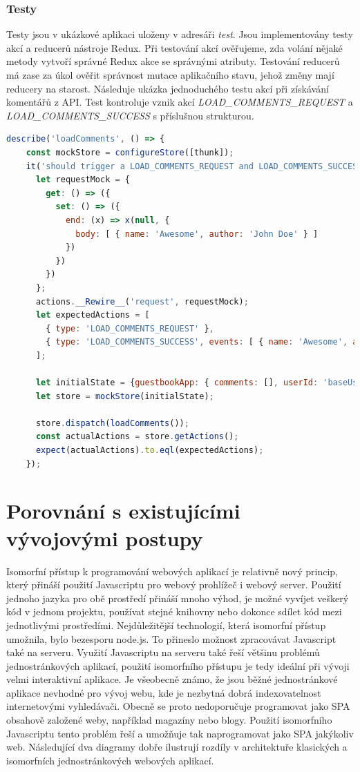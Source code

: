 \subsection{Testy}
Testy jsou v ukázkové aplikaci uloženy v adresáři \textit{test}. Jsou implementovány testy akcí a reducerů nástroje Redux. Při testování akcí ověřujeme, zda volání nějaké metody vytvoří správné Redux akce se správnými atributy. Testování reducerů má zase za úkol ověřit správnost mutace aplikačního stavu, jehož změny mají reducery na starost. Následuje ukázka jednoduchého testu akcí při získávání komentářů z API. Test kontroluje vznik akcí \textit{LOAD\_COMMENTS\_REQUEST} a \textit{LOAD\_COMMENTS\_SUCCESS} s příslušnou strukturou.
\begin{lstlisting}[language=Javascript, caption={Ukázka asynchronního testu získávání datových entit – komentářů}]
  describe('loadComments', () => {
    const mockStore = configureStore([thunk]);
    it('should trigger a LOAD_COMMENTS_REQUEST and LOAD_COMMENTS_SUCCESS action when succesful', () => {
      let requestMock = {
        get: () => ({
          set: () => ({
            end: (x) => x(null, {
              body: [ { name: 'Awesome', author: 'John Doe' } ]
            })
          })
        })
      };
      actions.__Rewire__('request', requestMock);
      let expectedActions = [
        { type: 'LOAD_COMMENTS_REQUEST' },
        { type: 'LOAD_COMMENTS_SUCCESS', events: [ { name: 'Awesome', author: 'John Doe' } ] }
      ];
      
      let initialState = {guestbookApp: { comments: [], userId: 'baseUser'} };
      let store = mockStore(initialState);

      store.dispatch(loadComments());
      const actualActions = store.getActions();
      expect(actualActions).to.eql(expectedActions);
    });
\end{lstlisting}


\chapter{Porovnání s existujícími vývojovými postupy}
Isomorfní přístup k programování webových aplikací je relativně nový princip, který přináší použití Javascriptu pro webový prohlížeč i webový server. Použití jednoho jazyka pro obě prostředí přináší mnoho výhod, je možné vyvíjet veškerý kód v jednom projektu, používat stejné knihovny nebo dokonce sdílet kód mezi jednotlivými prostředími. Nejdůležitější technologií, která isomorfní přístup umožnila, bylo bezesporu node.js. To přineslo možnost zpracovávat Javascript také na serveru. Využití Javascriptu na serveru také řeší většinu problémů jednostránkových aplikací, použití isomorfního přístupu je tedy ideální při vývoji velmi interaktivní aplikace. Je všeobecně známo, že jsou běžné jednostránkové aplikace nevhodné pro vývoj webu, kde je nezbytná dobrá indexovatelnost internetovými vyhledávači. Obecně se proto nedoporučuje programovat jako SPA obsahově založené weby, například magazíny nebo blogy. Použití isomorfního Javascriptu tento problém řeší a umožňuje tak naprogramovat jako SPA jakýkoliv web. Následující dva diagramy dobře ilustrují rozdíly v architektuře klasických a isomorfních jednostránkových webových aplikací.

